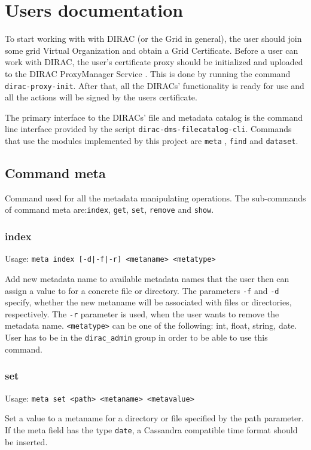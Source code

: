 \chapter{Users documentation}
To start working with with DIRAC 
(or the Grid in general), the user should join some 
grid Virtual Organization and obtain a Grid Certificate. 
Before a user can work with DIRAC, the user’s certificate proxy 
should be initialized and uploaded to the DIRAC ProxyManager Service \cite{DISET}.
This is done by running the command \texttt{dirac-proxy-init}. After that,
all the DIRACs' functionality is ready for use and all the actions will
be signed by the users certificate.

The primary interface to the DIRACs' file and metadata catalog
is the command line interface provided by the script
\texttt{dirac-dms-filecatalog-cli}. Commands that use the modules 
implemented by this project are \texttt{meta} , \texttt{find} 
and \texttt{dataset}.

\section{Command meta}
Command used for all the metadata manipulating operations.
The sub-commands of command meta are:\texttt{index}, \texttt{get},
\texttt{set}, \texttt{remove} and \texttt{show}.

\subsection{index}
Usage: \texttt{meta index [-d|-f|-r] <metaname> <metatype>}

Add new metadata name to available metadata names
that the user then can assign a value to for a concrete file
or directory. The parameters \texttt{-f} and \texttt{-d} specify,
whether the new metaname will be associated with files or directories,
respectively. The \texttt{-r} parameter is used, when the user
wants to remove the metadata name. \texttt{<metatype>} can be
one of the following: int, float, string, date. User has to be
in the \texttt{dirac\_admin} group in order to be able to use this
command.

\subsection{set}
Usage: \texttt{meta set <path> <metaname> <metavalue>}

Set a value to a metaname for a directory or file specified by
the path parameter. If the meta field has the type \texttt{date},
a Cassandra compatible time format should be inserted.

